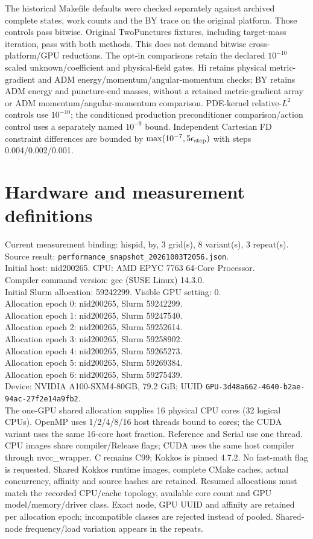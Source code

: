 \documentclass[11pt]{article}
\begin{document}
The historical Makefile defaults were checked separately against archived
complete states, work counts and the BY trace on the original platform.
Those controls pass bitwise. Original TwoPunctures fixtures, including
target-mass iteration, pass with both methods. This does not demand bitwise
cross-platform/GPU reductions. The opt-in comparisons retain the declared
$10^{-10}$ scaled unknown/coefficient and physical-field gates. Hi retains
physical metric-gradient and ADM energy/momentum/angular-momentum checks;
BY retains ADM energy and puncture-end masses, without a retained metric-gradient
array or ADM momentum/angular-momentum comparison. PDE-kernel relative-$L^2$
controls use $10^{-10}$; the conditioned
production preconditioner comparison/action control uses a separately named
$10^{-9}$ bound. Independent Cartesian FD constraint differences are bounded
by $\max(10^{-7},5\epsilon_{\rm step})$ with steps 0.004/0.002/0.001.
\section{Hardware and measurement definitions}
Current measurement binding: hispid, by, 3 grid(s), 8 variant(s), 3 repeat(s).\\
Source result: \texttt{performance\_snapshot\_20261003T2056.json}.\\
Initial host: nid200265. CPU: AMD EPYC 7763 64-Core Processor.\\
Compiler command version: gcc (SUSE Linux) 14.3.0.\\
Initial Slurm allocation: 59242299. Visible GPU setting: 0.\\
Allocation epoch 0: nid200265, Slurm 59242299.\\
Allocation epoch 1: nid200265, Slurm 59247540.\\
Allocation epoch 2: nid200265, Slurm 59252614.\\
Allocation epoch 3: nid200265, Slurm 59258902.\\
Allocation epoch 4: nid200265, Slurm 59265273.\\
Allocation epoch 5: nid200265, Slurm 59269384.\\
Allocation epoch 6: nid200265, Slurm 59275439.\\
Device: NVIDIA A100-SXM4-80GB, 79.2 GiB; UUID \texttt{GPU-3d48a662-4640-b2ae-94ac-27f2e14a9fb2}.\\
The one-GPU shared allocation supplies 16 physical CPU cores (32 logical
CPUs). OpenMP uses 1/2/4/8/16 host threads bound to cores; the CUDA variant
uses the same 16-core host fraction. Reference and Serial use one thread.
CPU images share compiler/Release flags; CUDA uses the same host compiler
through nvcc\_wrapper. C remains C99; Kokkos is pinned 4.7.2. No fast-math flag
is requested. Shared Kokkos runtime images, complete CMake caches, actual
concurrency, affinity and source hashes are retained.
Resumed allocations must match the recorded CPU/cache topology, available
core count and GPU model/memory/driver class. Exact node, GPU UUID and
affinity are retained per allocation epoch; incompatible classes are rejected
instead of pooled. Shared-node frequency/load variation appears in the repeats.
\end{document}
